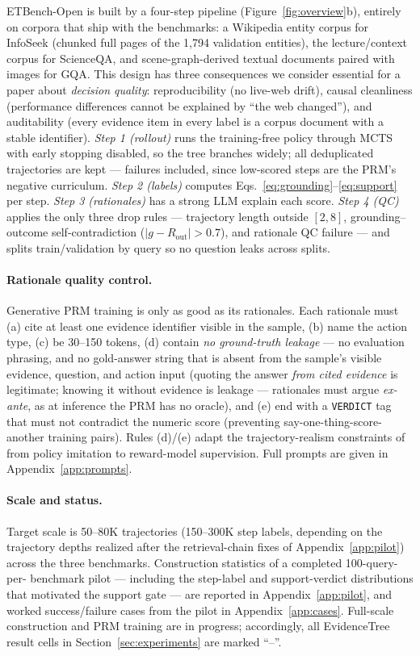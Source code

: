 \documentclass[letterpaper,twocolumn,10pt]{article}
\newcommand{\ours}{EvidenceTree}
\newcommand{\dataset}{ETBench-Open}
\newcommand{\NA}{--}          %
\begin{document}
\dataset{} is built by a four-step pipeline
(Figure~\ref{fig:overview}b), entirely on corpora that ship with the
benchmarks: a Wikipedia entity corpus for InfoSeek (chunked full pages of
the 1{,}794 validation entities), the lecture/context corpus for
ScienceQA, and scene-graph-derived textual documents paired with images
for GQA. This design has three consequences we consider essential for a
paper about \emph{decision quality}: reproducibility (no live-web drift),
causal cleanliness (performance differences cannot be explained by ``the
web changed''), and auditability (every evidence item in every label is a
corpus document with a stable identifier). \emph{Step 1 (rollout)} runs
the training-free policy through MCTS with early stopping disabled, so the
tree branches widely; all deduplicated trajectories are kept --- failures
included, since low-scored steps are the PRM's negative curriculum.
\emph{Step 2 (labels)} computes Eqs.~\eqref{eq:grounding}--\eqref{eq:support}
per step. \emph{Step 3 (rationales)} has a strong LLM explain each score.
\emph{Step 4 (QC)} applies the only three drop rules --- trajectory length
outside $[2,8]$, grounding--outcome self-contradiction
($|g - R_\mathrm{out}| > 0.7$), and rationale QC failure --- and splits
train/validation by query so no question leaks across splits.

\paragraph{Rationale quality control.}
Generative PRM training is only as good as its rationales. Each rationale
must (a) cite at least one evidence identifier visible in the sample, (b)
name the action type, (c) be 30--150 tokens, (d) contain \emph{no
ground-truth leakage} --- no evaluation phrasing, and no gold-answer string
that is absent from the sample's visible evidence, question, and action
input (quoting the answer \emph{from cited evidence} is legitimate;
knowing it without evidence is leakage --- rationales must argue
\emph{ex-ante}, as at inference the PRM has no oracle), and (e) end with a
\texttt{VERDICT} tag that must not contradict the numeric score
(preventing say-one-thing-score-another training pairs). Rules (d)/(e)
adapt the trajectory-realism constraints of
\citet{chen2026learningtosearch} from policy imitation to reward-model
supervision. Full prompts are given in Appendix~\ref{app:prompts}.

\paragraph{Scale and status.}
Target scale is 50--80K trajectories (150--300K step labels, depending on
the trajectory depths realized after the retrieval-chain fixes of
Appendix~\ref{app:pilot}) across the three benchmarks. Construction statistics of a completed 100-query-per-%
benchmark pilot --- including the step-label and support-verdict
distributions that motivated the support gate --- are reported in
Appendix~\ref{app:pilot}, and worked success/failure cases from the pilot
in Appendix~\ref{app:cases}. Full-scale construction and PRM training are
in progress; accordingly, all \ours{} result cells in
Section~\ref{sec:experiments} are marked ``\NA''.
\end{document}
